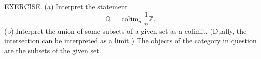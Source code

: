 EXERCISE. (a) Interpret the statement
$$\mathbb{Q}=\operatorname{colim}_n \frac{1}{n}\mathbb{Z}.$$
(b) Interpret the union of some subsets of a given set as a colimit. (Dually, the intersection can be interpreted as a limit.) The objects of the category in question are the subsets of the given set.
